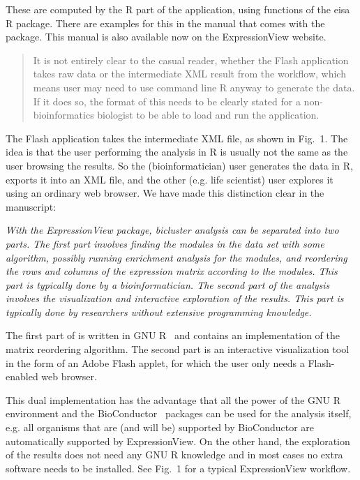 \documentclass[a4paper]{article}
\newenvironment{myquote}{\begin{quote}\color{blue}}{\end{quote}}
\begin{document}
These are computed by the R part of the application, using functions
of the eisa R package. There are examples for this in the manual that
comes with the package. This manual is also available now on the
ExpressionView website.

\begin{myquote}
It is not entirely clear to the casual reader,
whether the Flash application takes raw data or the intermediate XML
result from the workflow, which means user may need to use command
line R anyway to generate the data. If it does so, the format of this
needs to be clearly stated for a non-bioinformatics biologist to be
able to load and run the application. 
\end{myquote}

The Flash application takes the intermediate XML file, as shown
in Fig.~1. The idea is that the user performing the analysis in
R is usually not the same as the user browsing the results. So the
(bioinformatician) user generates the data in R, exports it into an
XML file, and the other (e.g. life scientist) user explores it using an
ordinary web browser. We have made this distinction clear in the
manuscript:

{\slshape
With the ExpressionView package, bicluster analysis can be separated
into two parts. The first part involves finding the
modules in the data set with some algorithm, possibly running
enrichment analysis for the modules, and reordering the rows and
columns of the expression matrix according to the modules. This
part is typically done by a bioinformatician. The second part of the
analysis involves the visualization and interactive exploration of the
results. This part is typically done by researchers without extensive
programming knowledge.

The first part of is written in GNU
R~\citep{R} and contains an implementation of the matrix reordering
algorithm. The second part is an interactive visualization tool in
the form of an Adobe Flash applet, for which the user only needs a
Flash-enabled web browser.

This dual implementation has the advantage that all the power of the
GNU R environment and the BioConductor~\citep{gentleman04} packages
can be used for the analysis itself, e.g. all organisms that are (and
will be) supported by BioConductor are automatically supported by
ExpressionView. On the other hand, the exploration of the results does
not need any GNU R knowledge and in most cases no extra software needs to
be installed. See Fig.~1 for a typical
ExpressionView workflow.
}
\end{document}
